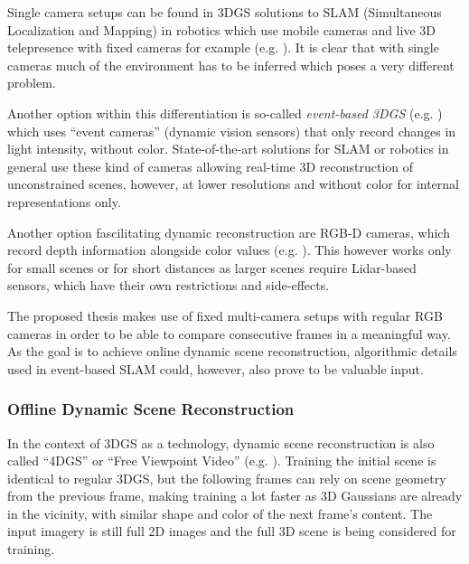 Single camera setups can be found in 3DGS solutions to SLAM (Simultaneous Localization and Mapping) in robotics which use mobile cameras and live 3D telepresence with fixed cameras for example (e.g. \cite{SplaTAM, TeleGS}). It is clear that with single cameras much of the environment has to be inferred which poses a very different problem.

Another option within this differentiation is so-called \textit{event-based 3DGS} (e.g. \cite{event3DGS}) which uses \enquote{event cameras} (dynamic vision sensors) that only record changes in light intensity, without color. State-of-the-art solutions for SLAM or robotics in general use these kind of cameras allowing real-time 3D reconstruction of unconstrained scenes, however, at lower resolutions and without color for internal representations only.

Another option fascilitating dynamic reconstruction are RGB-D cameras, which record depth information alongside color values (e.g. \cite{SplaTAM}). This however works only for small scenes or for short distances as larger scenes require Lidar-based sensors, which have their own restrictions and side-effects.

The proposed thesis makes use of fixed multi-camera setups with regular RGB cameras in order to be able to compare consecutive frames in a meaningful way. As the goal is to achieve online dynamic scene reconstruction, algorithmic details used in event-based SLAM could, however, also prove to be valuable input.

\subsubsection{Offline Dynamic Scene Reconstruction}
In the context of 3DGS as a technology, dynamic scene reconstruction is also called \enquote{4DGS} or \enquote{Free Viewpoint Video} (e.g. \cite{yangDeformable3DGaussians2024, wu4DGaussianSplatting2024,yangRealtimePhotorealisticDynamic2024}). Training the initial scene is identical to regular 3DGS, but the following frames can rely on scene geometry from the previous frame, making training a lot faster as 3D Gaussians are already in the vicinity, with similar shape and color of the next frame's content.
The input imagery is still full 2D images and the full 3D scene is being considered for training.

